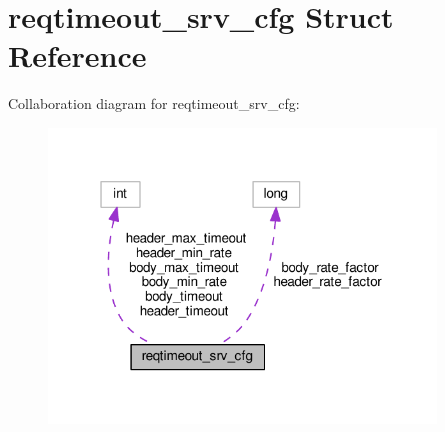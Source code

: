 \hypertarget{structreqtimeout__srv__cfg}{}\section{reqtimeout\+\_\+srv\+\_\+cfg Struct Reference}
\label{structreqtimeout__srv__cfg}


Collaboration diagram for reqtimeout\+\_\+srv\+\_\+cfg\+:
\nopagebreak
\begin{figure}[H]
\begin{center}
\leavevmode
\includegraphics[width=292pt]{structreqtimeout__srv__cfg__coll__graph}
\end{center}
\end{figure}
